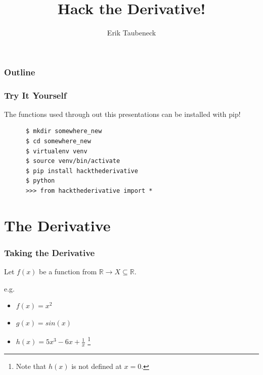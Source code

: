 \documentclass{beamer}
\title{
{\bf{\textsf{Hack the Derivative!}}}}
\author[Erik Taubeneck]{Erik Taubeneck}
\institute{
  \texttt{[image: gamechanger.png]}

  Software Engineer
}
\date{
  October 20th, 2015

  American University Math/Stat Dept Colloquium
}
\def\R{\mathbb{R}}                     %
\begin{document}


\begin{frame}
  \titlepage
\end{frame}


\begin{frame}
\frametitle{Outline}
\tableofcontents
\end{frame}

\begin{frame}[fragile]

  \frametitle{Try It Yourself}

  The functions used through out this presentations can be installed with pip!

  \begin{lstlisting}
      $ mkdir somewhere_new
      $ cd somewhere_new
      $ virtualenv venv
      $ source venv/bin/activate
      $ pip install hackthederivative
      $ python
      >>> from hackthederivative import *
  \end{lstlisting}

\end{frame}


\section{The Derivative}

\begin{frame}

  \frametitle{Taking the Derivative}

  Let $f(x)$ be a function from $\R \to X \subseteq \R$.

  e.g.
  \begin{itemize}
    \item $f(x) = x^2$
    \item $g(x) = sin(x)$
    \item $h(x) = 5x^3 - 6x + \frac{1}{x}$ \footnote{Note that $h(x)$ is not defined at $x=0$.}
  \end{itemize}



\end{frame}
\end{document}
